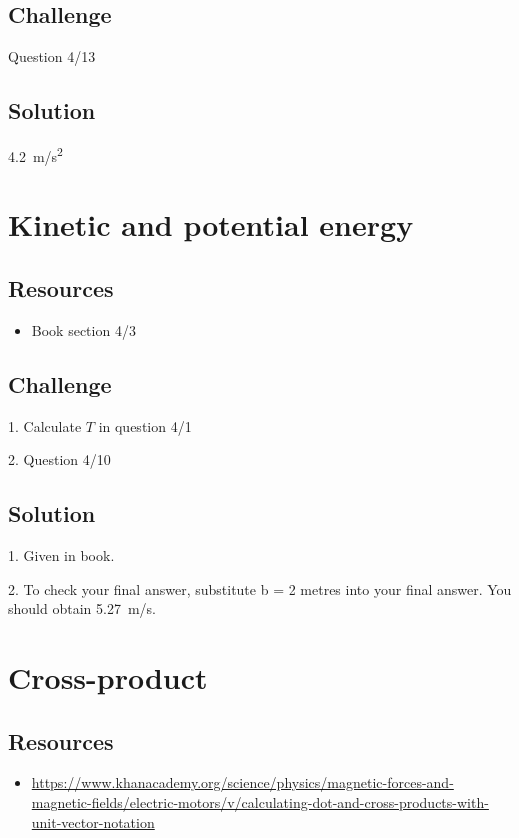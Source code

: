 \subsection*{Challenge}
Question 4/13

\subsection*{Solution}
\SI{4.2}{m/s^2}




\newpage
\section{Kinetic and potential energy}

\subsection*{Resources}
\begin{itemize}
    \item Book section 4/3
\end{itemize}

\subsection*{Challenge}
1. Calculate $T$ in question 4/1

2. Question 4/10

\subsection*{Solution}
1. Given in book.

2. To check your final answer, substitute b = 2 metres into your final answer. You should obtain \SI{5.27}{m/s}.



\newpage
\section{Cross-product}

\subsection*{Resources}
\begin{itemize}
    \item \url{https://www.khanacademy.org/science/physics/magnetic-forces-and-magnetic-fields/electric-motors/v/calculating-dot-and-cross-products-with-unit-vector-notation}
\end{itemize}


